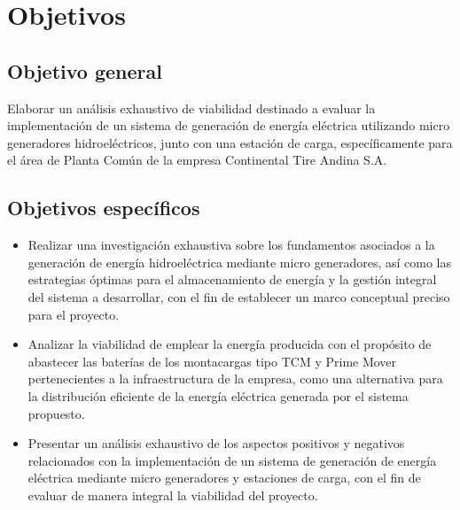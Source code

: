 \documentclass[11pt]{article}
\begin{document}
    \section{Objetivos}

        \subsection{Objetivo general}
        Elaborar un análisis exhaustivo de viabilidad destinado a evaluar la implementación de un
        sistema de generación de energía eléctrica utilizando micro generadores hidroeléctricos,
        junto con una estación de carga, específicamente para el área de Planta Común de la
        empresa Continental Tire Andina S.A.
        
        \subsection{Objetivos específicos}
            \begin{itemize}
                \item Realizar una investigación exhaustiva sobre los fundamentos asociados a la
                generación de energía hidroeléctrica mediante micro generadores, así como las
                estrategias óptimas para el almacenamiento de energía y la gestión integral del
                sistema a desarrollar, con el fin de establecer un marco conceptual preciso para el
                proyecto.

                \item Analizar la viabilidad de emplear la energía producida con el propósito de abastecer
                las baterías de los montacargas tipo TCM y Prime Mover pertenecientes a la
                infraestructura de la empresa, como una alternativa para la distribución eficiente de
                la energía eléctrica generada por el sistema propuesto.

                \item Presentar un análisis exhaustivo de los aspectos positivos y negativos relacionados
                con la implementación de un sistema de generación de energía eléctrica mediante
                micro generadores y estaciones de carga, con el fin de evaluar de manera integral la
                viabilidad del proyecto.
                
            \end{itemize}
      
\end{document}

